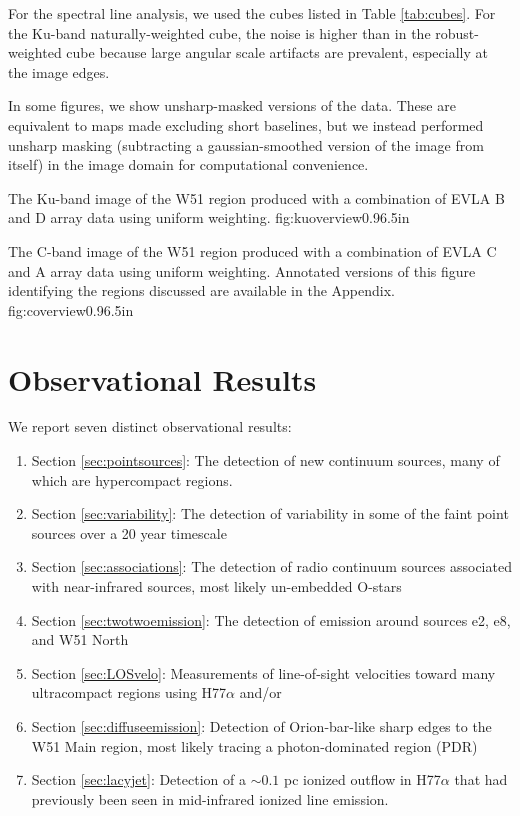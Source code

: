 For the spectral line analysis, we used the cubes listed in Table
\ref{tab:cubes}.  For the Ku-band naturally-weighted cube, the noise is higher
than in the robust-weighted cube because large angular scale artifacts are
prevalent, especially at the image edges.

In some figures, we show unsharp-masked versions of the data.  These are
equivalent to maps made excluding short baselines, but we instead performed
unsharp masking (subtracting a gaussian-smoothed version of the image from
itself) in the image domain for computational convenience.



{The Ku-band image of the W51 region produced with a combination of
EVLA B and D array data using uniform weighting.}
{fig:kuoverview}{0.9}{6.5in}

{The C-band image of the W51 region produced with a combination of EVLA
C and A array data using uniform weighting.  Annotated versions of this figure
identifying the regions discussed are available in the Appendix.}
{fig:coverview}{0.9}{6.5in}

\section{Observational Results}
\label{sec:results}
We report seven distinct observational results: 
\begin{enumerate}
    \item Section \ref{sec:pointsources}: The detection of new continuum
        sources, many of which are  hypercompact \hii regions. 
    \item Section \ref{sec:variability}: The detection of variability in
        some of the faint point sources over a 20 year timescale
    \item Section \ref{sec:associations}: The detection of radio continuum
        sources associated with near-infrared sources, most likely un-embedded
        O-stars
    \item Section \ref{sec:twotwoemission}: The detection of \formaldehyde
        \twotwo emission around sources e2, e8, and W51 North
    \item Section \ref{sec:LOSvelo}: Measurements of line-of-sight velocities
        toward many ultracompact \hii regions using H77$\alpha$ and/or
        \formaldehyde
    \item Section \ref{sec:diffuseemission}: Detection of Orion-bar-like sharp
        edges to the W51 Main \hii region, most likely tracing a
        photon-dominated region (PDR)
    \item Section \ref{sec:lacyjet}: Detection of a $\sim0.1$ pc ionized
        outflow in H77$\alpha$ that had previously been seen in mid-infrared
        ionized line emission.
\end{enumerate}


